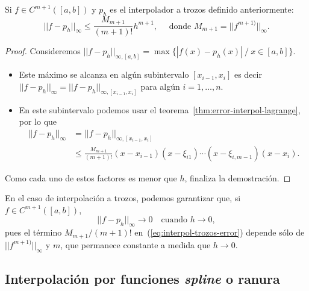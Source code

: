     \begin{theorem}
      \label{thm:interpol-trozos-error}
      Si $f\in C^{m+1}( [a,b])$ y $p_h$ es el interpolador a trozos
      definido anteriormente:
      \begin{equation}
        ||f-p_h||_\infty\le\frac{M_{m+1}}{(m+1)!}h^{m+1},
        \quad
        \text{ donde } M_{m+1}=||f^{m+1)}||_\infty.
        \label{eq:interpol-trozos-error}
      \end{equation}
    \end{theorem}

    \begin{proof}
      Consideremos $||f-p_h||_{\infty, [a,b]}=\max\{ |f(x)-p_h(x)|\ /\
      x\in[a,b]\}$.
      \begin{itemize}
      \item Este máximo se alcanza en algún subintervalo $[x_{i-1},x_{i}]$
        es decir $||f-p_h||_{\infty}=||f-p_h||_{\infty, [x_{i-1},x_i]}$
        para algún $i=1,\dots,n$.
      \item En este subintervalo podemos usar el
        teorema~\ref{thm:error-interpol-lagrange}, por lo que
        \begin{align*}
          ||f-p_h||_\infty &= ||f-p_h||_{\infty, [x_{i-1},x_i]}  \\
          &\le\frac{M_{m+1}}{(m+1)!}
          (x-x_{i-1})(x-\xi_{i1})\cdots(x-\xi_{i,m-1})(x-x_i).
        \end{align*}
      \end{itemize}
      Como cada uno de estos factores es menor que $h$, finaliza la
      demostración.
    \end{proof}

    \begin{remark}
      \label{rk:3}
      En el caso de interpolación a trozos, podemos garantizar que, si
      $f\in C^{m+1}([a,b])$,
      \begin{equation*}
        ||f-p_h||_\infty \to 0 \quad \text{cuando } h \to 0,
      \end{equation*}
      pues el término $M_{m+1}/(m+1)!$ en~(\ref{eq:interpol-trozos-error})
      depende sólo de $||f^{m+1)}||_\infty$ y $m$, que permanece constante
        a medida que $h\to 0$.
    \end{remark}

    \subsection{Interpolación por funciones \textit{spline} o ranura}
    \label{sec:splines}


